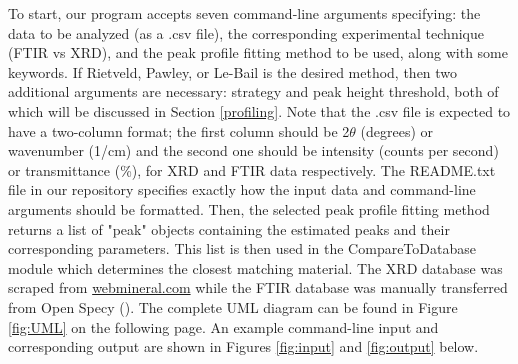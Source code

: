 \documentclass{dhbenelux}
\begin{document}
To start, our program accepts seven command-line arguments specifying: the data to be analyzed (as a .csv file), the corresponding experimental technique (FTIR vs XRD), and the peak profile fitting method to be used, along with some keywords. If Rietveld, Pawley, or Le-Bail is the desired method, then two additional arguments are necessary: strategy and peak height threshold, both of which will be discussed in Section \ref{profiling}. Note that the .csv file is expected to have a two-column format; the first column should be 2$\theta$ (degrees) or wavenumber (1/cm) and the second one should be intensity (counts per second) or transmittance (\%), for XRD and FTIR data respectively. The README.txt file in our repository specifies exactly how the input data and command-line arguments should be formatted. Then, the selected peak profile fitting method returns a list of "peak" objects containing the estimated peaks and their corresponding parameters. This list is then used in the CompareToDatabase module which determines the closest matching material. The XRD database was scraped from \href{http://webmineral.com/}{webmineral.com} while the FTIR database was manually transferred from Open Specy (\cite{cowger_gray_hapich_rochman_lynch_primpke_munno_frond_herodotou_2020}). The complete UML diagram can be found in Figure \ref{fig:UML} on the following page. An example command-line input and corresponding output are shown in Figures \ref{fig:input} and \ref{fig:output} below.
\end{document}
